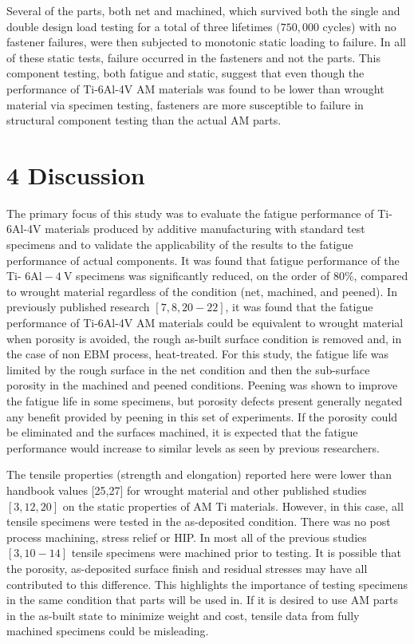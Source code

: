 \documentclass[10pt]{article}
\begin{document}
Several of the parts, both net and machined, which survived both the single and double design load testing for a total of three lifetimes $(750,000$ cycles) with no fastener failures, were then subjected to monotonic static loading to failure. In all of these static tests, failure occurred in the fasteners and not the parts. This component testing, both fatigue and static, suggest that even though the performance of Ti-6Al-4V AM materials was found to be lower than wrought material via specimen testing, fasteners are more susceptible to failure in structural component testing than the actual AM parts.

\section*{4 Discussion}
The primary focus of this study was to evaluate the fatigue performance of Ti-6Al-4V materials produced by additive manufacturing with standard test specimens and to validate the applicability of the results to the fatigue performance of actual components. It was found that fatigue performance of the Ti- $6 \mathrm{Al}-4 \mathrm{~V}$ specimens was significantly reduced, on the order of $80 \%$, compared to wrought material regardless of the condition (net, machined, and peened). In previously published research $[7,8,20-22]$, it was found that the fatigue performance of Ti-6Al-4V AM materials could be equivalent to wrought material when porosity is avoided, the rough as-built surface condition is removed and, in the case of non EBM process, heat-treated. For this study, the fatigue life was limited by the rough surface in the net condition and then the sub-surface porosity in the machined and peened conditions. Peening was shown to improve the fatigue life in some specimens, but porosity defects present generally negated any benefit provided by peening in this set of experiments. If the porosity could be eliminated and the surfaces machined, it is expected that the fatigue performance would increase to similar levels as seen by previous researchers.

The tensile properties (strength and elongation) reported here were lower than handbook values [25,27] for wrought material and other published studies $[3,12,20]$ on the static properties of AM Ti materials. However, in this case, all tensile specimens were tested in the as-deposited condition. There was no post process machining, stress relief or HIP. In most all of the previous studies $[3,10-14]$ tensile specimens were machined prior to testing. It is possible that the porosity, as-deposited surface finish and residual stresses may have all contributed to this difference. This highlights the importance of testing specimens in the same condition that parts will be used in. If it is desired to use AM parts in the as-built state to minimize weight and cost, tensile data from fully machined specimens could be misleading.
\end{document}
